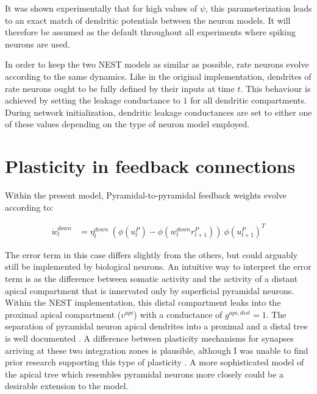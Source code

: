 It was shown experimentally that for high values of $\psi$, this parameterization leads to an exact match of dendritic
potentials between the neuron models. It will therefore be assumed as the default throughout all experiments where
spiking neurons are used. \newline

In order to keep the two NEST models as similar as possible, rate neurons evolve according to the same dynamics. Like in
the original implementation, dendrites of rate neurons ought to be fully defined by their inputs at time $t$. This
behaviour is achieved by setting the leakage conductance to $1$ for all dendritic compartments. During network
initialization, dendritic leakage conductances are set to either one of these values depending on the type of neuron
model employed.


\section{Plasticity in feedback connections}\label{sec-feedback-plast}


Within the present model, Pyramidal-to-pyramidal feedback weights evolve according to:

\begin{align}
  \dot{w}_{l}^{down} & = \eta_l^{down} \ ( \phi(u_l^{P}) - \phi(w_l^{down} r_{l+1}^P) )\ \phi(u_{l+1}^{P})^T
\end{align}

The error term in this case differs slightly from the others, but could arguably still be implemented by biological
neurons. An intuitive way to interpret the error term is as the difference between somatic activity and the activity of
a distant apical compartment that is innervated only by superficial pyramidal neurons. Within the NEST implementation,
this distal compartment leaks into the proximal apical compartment ($v^{api}$) with a conductance of $g^{api,dist}=1$.
The separation of pyramidal neuron apical dendrites into a proximal and a distal tree is well documented \citeme. A
difference between plasticity mechanisms for synapses arriving at these two integration zones is plausible, although I
was unable to find prior research supporting this type of plasticity \citeme.  A more sophisticated model of the apical
tree which resembles pyramidal neurons more closely could be a desirable extension to the model.

